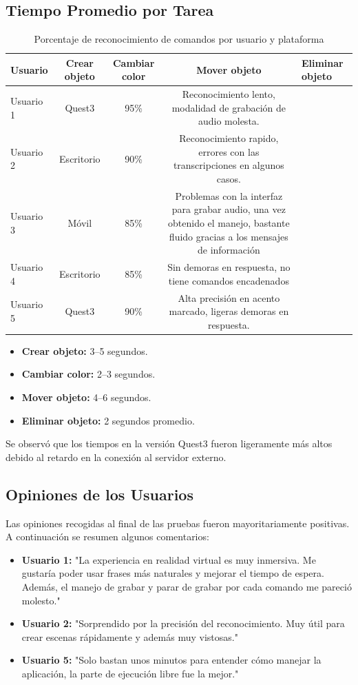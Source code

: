 \documentclass[a4paper, 12pt]{book}
\begin{document}
\subsection{Tiempo Promedio por Tarea}
\begin{table}[H]
\centering
\begin{tabular}{|l|c|c|c|p{6cm}|}
\hline
\textbf{Usuario} & \textbf{Crear objeto} & \textbf{Cambiar color} & \textbf{Mover objeto} & \textbf{Eliminar objeto} \\
\hline
Usuario 1 & Quest3 & 95\% & Reconocimiento lento, modalidad de grabación de audio molesta. \\
\hline
Usuario 2 & Escritorio  & 90\% & Reconocimiento rapido, errores con las transcripciones en algunos casos. \\
\hline
Usuario 3 & Móvil & 85\% & Problemas con la interfaz para grabar audio, una vez obtenido el manejo, bastante fluido gracias a los mensajes de información \\
\hline
Usuario 4 & Escritorio  & 85\% & Sin demoras en respuesta, no tiene comandos encadenados \\
\hline
Usuario 5 & Quest3 & 90\% & Alta precisión en acento marcado, ligeras demoras en respuesta. \\
\hline
\end{tabular}
\caption{Porcentaje de reconocimiento de comandos por usuario y plataforma}
\label{tab:precision_comandos}
\end{table}
\begin{itemize}
 \item \textbf{Crear objeto:} 3–5 segundos.
 \item \textbf{Cambiar color:} 2–3 segundos.
 \item \textbf{Mover objeto:} 4–6 segundos.
 \item \textbf{Eliminar objeto:} 2 segundos promedio.
\end{itemize}

Se observó que los tiempos en la versión Quest3 fueron ligeramente más altos debido al retardo en la conexión al servidor externo.

\subsection{Opiniones de los Usuarios}

Las opiniones recogidas al final de las pruebas fueron mayoritariamente positivas. A continuación se resumen algunos comentarios:

\begin{itemize}
 \item \textbf{Usuario 1:} "La experiencia en realidad virtual es muy inmersiva. Me gustaría poder usar frases más naturales y mejorar el tiempo de espera. Además, el manejo de grabar y parar de grabar por cada comando me pareció molesto."
 \item \textbf{Usuario 2:} "Sorprendido por la precisión del reconocimiento. Muy útil para crear escenas rápidamente y además muy vistosas."
 \item \textbf{Usuario 5:} "Solo bastan unos minutos para entender cómo manejar la aplicación, la parte de ejecución libre fue la mejor."
\end{itemize}
\end{document}
